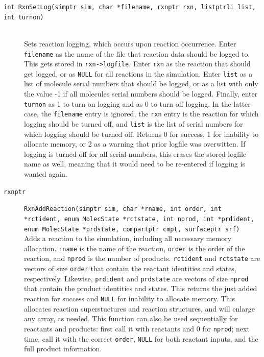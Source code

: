 \documentclass {scrbook}
\newcommand {\ttt} {\texttt}
\begin{document}
\begin{description}
\item[\ttt{int RxnSetLog(simptr sim, char *filename, rxnptr rxn, listptrli list, int turnon)}]
\hfill \\
Sets reaction logging, which occurs upon reaction occurrence. Enter \ttt{filename} as the name of the file that reaction data should be logged to. This gets stored in \ttt{rxn->logfile}. Enter \ttt{rxn} as the reaction that should get logged, or as \ttt{NULL} for all reactions in the simulation. Enter \ttt{list} as a list of molecule serial numbers that should be logged, or as a list with only the value -1 if all molecules serial numbers should be logged. Finally, enter \ttt{turnon} as 1 to turn on logging and as 0 to turn off logging. In the latter case, the \ttt{filename} entry is ignored, the \ttt{rxn} entry is the reaction for which logging should be turned off, and \ttt{list} is the list of serial numbers for which logging should be turned off. Returns 0 for success, 1 for inability to allocate memory, or 2 as a warning that prior logfile was overwitten. If logging is turned off for all serial numbers, this erases the stored logfile name as well, meaning that it would need to be re-entered if logging is wanted again.

\item[\ttt{rxnptr}]
\ttt{RxnAddReaction(simptr sim, char *rname, int order, int *rctident, enum MolecState *rctstate, int nprod, int *prdident, enum MolecState *prdstate, compartptr cmpt, surfaceptr srf)} \\
Adds a reaction to the simulation, including all necessary memory allocation. \ttt{rname} is the name of the reaction, \ttt{order} is the order of the reaction, and \ttt{nprod} is the number of products. \ttt{rctident} and \ttt{rctstate} are vectors of size \ttt{order} that contain the reactant identities and states, respectively. Likewise, \ttt{prdident} and \ttt{prdstate} are vectors of size \ttt{nprod} that contain the product identities and states. This returns the just added reaction for success and \ttt{NULL} for inability to allocate memory. This allocates reaction superstuctures and reaction structures, and will enlarge any array, as needed. This function can also be used sequentially for reactants and products: first call it with reactants and 0 for \ttt{nprod}; next time, call it with the correct \ttt{order}, \ttt{NULL} for both reactant inputs, and the full product information.


\end{description}
\end{document}
